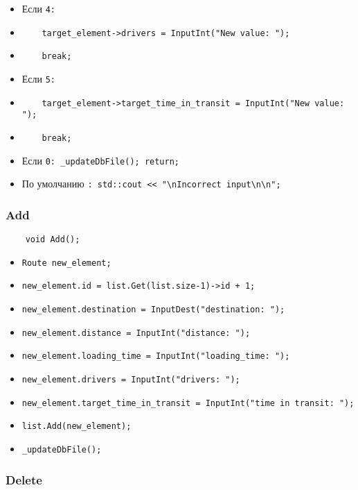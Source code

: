 \begin{itemize}
\begin{itemize}
\begin{itemize}
                \item Если \verb|4:|
                \item \verb|    target_element->drivers = InputInt("New value: ");|
                \item \verb|    break;|
                \item Если \verb|5:|
                \item \verb|    target_element->target_time_in_transit = InputInt("New value: ");|
                \item \verb|    break;|
                \item Если \verb|0: _updateDbFile(); return;|
                \item По умолчанию \verb|: std::cout << "\nIncorrect input\n\n";|
            \end{itemize}
        \end{itemize}
\end{itemize}

\subsubsection{Add}

\begin{lstlisting}
    void Add();
\end{lstlisting}

\begin{itemize}
    \item \verb|Route new_element;|
    \item \verb|new_element.id = list.Get(list.size-1)->id + 1;|
    \item \verb|new_element.destination = InputDest("destination: ");|
    \item \verb|new_element.distance = InputInt("distance: ");|
    \item \verb|new_element.loading_time = InputInt("loading_time: ");|
    \item \verb|new_element.drivers = InputInt("drivers: ");|
    \item \verb|new_element.target_time_in_transit = InputInt("time in transit: ");|
    \item \verb|list.Add(new_element);|
    \item \verb|_updateDbFile();|
\end{itemize}

\subsubsection{Delete}

